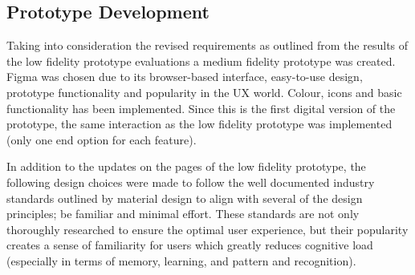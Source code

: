 \documentclass[a4 paper, 12pt]{article}
\begin{document}
\subsection{Prototype Development}
Taking into consideration the revised requirements as outlined from the results of the low fidelity prototype evaluations a medium fidelity prototype was created. Figma was chosen due to its browser-based interface, easy-to-use design, prototype functionality and popularity in the UX world. Colour, icons and basic functionality has been implemented. Since this is the first digital version of the prototype, the same interaction as the low fidelity prototype was implemented (only one end option for each feature). 

In addition to the updates on the pages of the low fidelity prototype, the following design choices were made to follow the well documented industry standards outlined by material design to align with several of the design principles; be familiar and minimal effort. These standards are not only thoroughly researched to ensure the optimal user experience, but their popularity creates a sense of familiarity for users which greatly reduces cognitive load (especially in terms of memory, learning, and pattern and recognition). 
\end{document}
